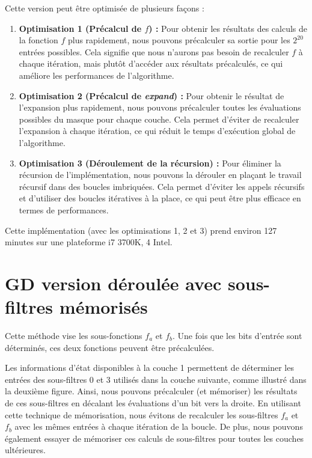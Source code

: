 \documentclass{template}
\begin{document}
Cette version peut être optimisée de plusieurs façons :
\begin{enumerate}
  \item \textbf{Optimisation 1 (Précalcul de $f$) :} Pour obtenir les résultats des calculs de la fonction $f$ plus rapidement, nous pouvons précalculer sa sortie pour les $2^{20}$ entrées possibles. Cela signifie que nous n'aurons pas besoin de recalculer $f$ à chaque itération, mais plutôt d'accéder aux résultats précalculés, ce qui améliore les performances de l'algorithme.
  \item \textbf{Optimisation 2 (Précalcul de \textit{expand}) :} Pour obtenir le résultat de l'expansion plus rapidement, nous pouvons précalculer toutes les évaluations possibles du masque pour chaque couche. Cela permet d'éviter de recalculer l'expansion à chaque itération, ce qui réduit le temps d'exécution global de l'algorithme.
  \item \textbf{Optimisation 3 (Déroulement de la récursion) :} Pour éliminer la récursion de l'implémentation, nous pouvons la dérouler en plaçant le travail récursif dans des boucles imbriquées. Cela permet d'éviter les appels récursifs et d'utiliser des boucles itératives à la place, ce qui peut être plus efficace en termes de performances.
\end{enumerate}

Cette implémentation (avec les optimisations 1, 2 et 3) prend environ 127 minutes sur une plateforme i7 3700K, 4 Intel.

\section{GD version déroulée avec sous-filtres mémorisés}
\baselineskip=16pt
Cette méthode vise les sous-fonctions $f_a$ et $f_b$. Une fois que les bits d'entrée sont déterminés, ces deux fonctions peuvent être précalculées.

Les informations d'état disponibles à la couche 1 permettent de déterminer les entrées des sous-filtres 0 et 3 utilisés dans la couche suivante, comme illustré dans la deuxième figure. Ainsi, nous pouvons précalculer (et mémoriser) les résultats de ces sous-filtres en décalant les évaluations d'un bit vers la droite. En utilisant cette technique de mémorisation, nous évitons de recalculer les sous-filtres $f_a$ et $f_b$ avec les mêmes entrées à chaque itération de la boucle. De plus, nous pouvons également essayer de mémoriser ces calculs de sous-filtres pour toutes les couches ultérieures.
\end{document}

